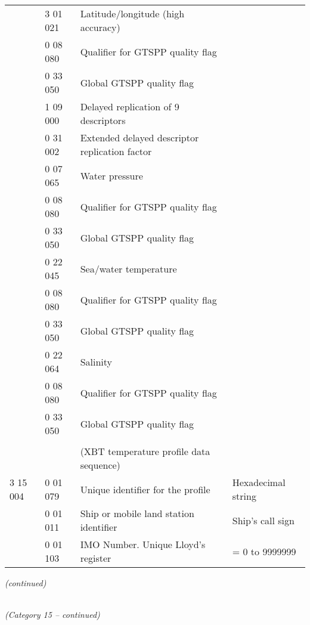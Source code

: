 \begin{longtable}[]{@{}llll@{}}
& 3 01 021 & Latitude/longitude (high accuracy) &\tabularnewline
& 0 08 080 & Qualifier for GTSPP quality flag &\tabularnewline
& 0 33 050 & Global GTSPP quality flag &\tabularnewline
& 1 09 000 & Delayed replication of 9 descriptors &\tabularnewline
& 0 31 002 & Extended delayed descriptor replication factor &\tabularnewline
& 0 07 065 & Water pressure &\tabularnewline
& 0 08 080 & Qualifier for GTSPP quality flag &\tabularnewline
& 0 33 050 & Global GTSPP quality flag &\tabularnewline
& 0 22 045 & Sea/water temperature &\tabularnewline
& 0 08 080 & Qualifier for GTSPP quality flag &\tabularnewline
& 0 33 050 & Global GTSPP quality flag &\tabularnewline
& 0 22 064 & Salinity &\tabularnewline
& 0 08 080 & Qualifier for GTSPP quality flag &\tabularnewline
& 0 33 050 & Global GTSPP quality flag &\tabularnewline
& & &\tabularnewline
& & (XBT temperature profile data sequence) &\tabularnewline
3 15 004 & 0 01 079 & Unique identifier for the profile & Hexadecimal string\tabularnewline
& 0 01 011 & Ship or mobile land station identifier & Ship's call sign\tabularnewline
& 0 01 103 & IMO Number. Unique Lloyd's register & = 0 to 9999999\tabularnewline
\bottomrule
\end{longtable}

\emph{(continued)}

\emph{\\
(Category 15 -- continued)}

